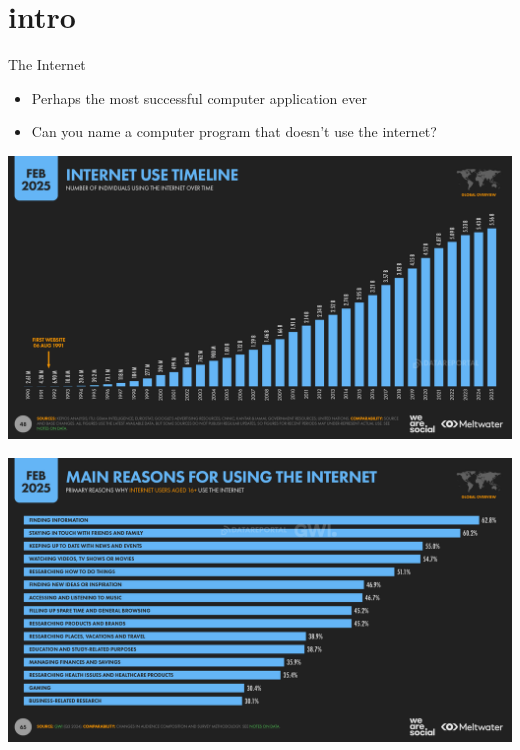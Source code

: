 


\section{intro}

\begin{frame}{The Internet}
    \begin{itemize}
    \item Perhaps the most successful computer application ever
    \item Can you name a computer program that doesn't use the internet?
    \end{itemize}
\end{frame}

\begin{frame}{}
\begin{center}
\includegraphics[width=0.8\pagewidth]{../network/internet_users.png}
\end{center}
\end{frame}

\begin{frame}{}
\begin{center}
\includegraphics[width=0.8\pagewidth]{../network/internet_reasons.png}
\end{center}
\end{frame}

